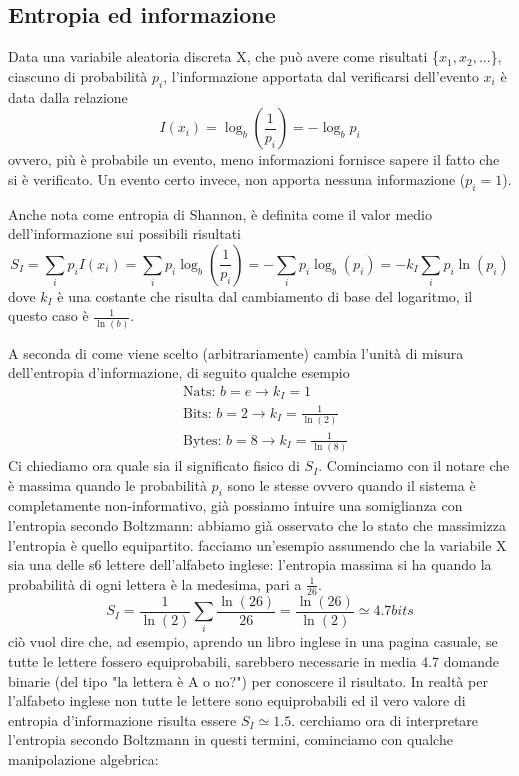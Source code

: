 \documentclass[
10pt, %
a4paper, %
oneside, %
headinclude,footinclude, %
BCOR5mm, %
]{scrartcl}
\begin{document}
\subsection{Entropia ed informazione}
\begin{definition}
	Data una variabile aleatoria discreta X, che può avere come risultati \{\(x_1,x_2,...\)\}, ciascuno di probabilità \(p_i\), l'informazione apportata dal verificarsi dell'evento \(x_i\) è data dalla relazione
	\[I(x_i) = \log_b \left(\frac{1}{p_i}\right)=-\log_b p_i \]
	ovvero, più è probabile un evento, meno informazioni fornisce sapere il fatto che si è verificato. Un evento certo invece, non apporta nessuna informazione (\(p_i = 1\)). 
\end{definition}
\begin{definition}
	Anche nota come entropia di Shannon, è definita come il valor medio dell'informazione sui possibili risultati
	\[S_I=\sum_ip_iI(x_i) = \sum_ip_i\log_b\left(\frac{1}{p_i}\right)=-\sum_ip_i\log_b(p_i)= -k_I\sum_ip_i\ln(p_i)\]
	dove \(k_I\) è una costante che risulta dal cambiamento di base del logaritmo, il questo caso è \(\frac{1}{\ln(b)}\). 
\end{definition}
A seconda di come viene scelto (arbitrariamente) cambia l'unità di misura dell'entropia d'informazione, di seguito qualche esempio 
\begin{align*}
	&\text{Nats: }b=e\rightarrow k_I = 1\\
	&\text{Bits: }b = 2\rightarrow k_I=\frac{1}{\ln(2)}\\
	&\text{Bytes: }b = 8\rightarrow k_I = \frac{1}{\ln(8)}
\end{align*}
Ci chiediamo ora quale sia il significato fisico di \(S_I\). Cominciamo con il notare che è massima quando le probabilità \(p_i\) sono le stesse ovvero quando il sistema è completamente non-informativo, già possiamo intuire una somiglianza con l'entropia secondo Boltzmann: abbiamo già osservato che lo stato che massimizza l'entropia è quello equipartito. facciamo un'esempio assumendo che la variabile X sia una delle s6 lettere dell'alfabeto inglese: l'entropia massima si ha quando la probabilità di ogni lettera è la medesima, pari a $\frac{1}{26}$. 
\[S_I = \frac{1}{\ln(2)}\sum_i\frac{\ln(26)}{26}=\frac{\ln(26)}{\ln(2)}\simeq 4.7 bits\]
ciò vuol dire che, ad esempio, aprendo un libro inglese in una pagina casuale, se tutte le lettere fossero equiprobabili, sarebbero necessarie in media 4.7 domande binarie (del tipo "la lettera è A o no?") per conoscere il risultato. In realtà per l'alfabeto inglese non tutte le lettere sono equiprobabili ed il vero valore di entropia d'informazione risulta essere \(S_I \simeq 1.5\). cerchiamo ora di interpretare l'entropia secondo Boltzmann in questi termini, cominciamo con qualche manipolazione algebrica:
\end{document}
